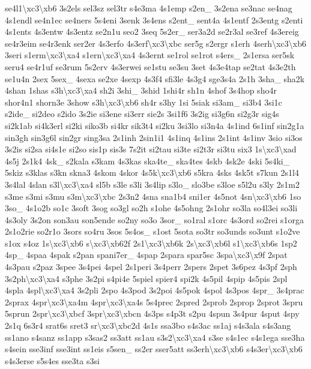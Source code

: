 {se4l1\textbackslash{}xc3\textbackslash{}xb6 3s2els sel3sz sel3tr s4e3ma 4s1emp s2en\-\_\- 3s2ena se3nac se4nag 4s1endl se4n1ec se4ners 5s4eni 3senk 3s4ens s2ent\-\_\- sent4a 4s1entf 2s3entg s2enti 4s1ents 4s3entw 4s3entz se2n1u seo2 3seq 5s2er\-\_\- ser3a2d se2r3al se3ref 4s3ereig se4r3eim se4r3enk ser2er 4s3erfo 4s3erf\textbackslash{}xc3\textbackslash{}xbc ser5g s2ergr s1erh 4serh\textbackslash{}xc3\textbackslash{}xb6 3seri s1erm\textbackslash{}xc3\textbackslash{}xa4 s1ern\textbackslash{}xc3\textbackslash{}xa4 4s3ernt se1rol se1rot s4ers\-\_\- 2s1ersa ser5sk seru4 se4r1uf se3rum 5s2erv 4s3erwei se1stu se3su 3set 4s3e4tap se2tat 4s3e2th se1u4n 2sex 5sex\-\_\- 4sexa se2xe 4sexp 4s3f4 sfi3le 4s3g4 sge3s4a 2s1h 3sha\-\_\- sha2k 4shan 1shas s3h\textbackslash{}xc3\textbackslash{}xa4 sh2i 3shi\-\_\- 3shid 1shi4r sh1n 4shof 3s4hop sho4r shor4n1 shorn3e 3show s3h\textbackslash{}xc3\textbackslash{}xb6 sh4r s3hy 1si 5siak si3am\-\_\- si3b4 3si1c s2ide\-\_\- si2deo s2ido 3s2ie si3ene si3err sie2s 3si1f6 3s2ig si3g6n si2g3r sig4s si2k1ab si4k3erl si2ki siko3b si4kr sik3t4 si2ku 3si3lo si3n4a 4s1ind 6s1inf sin2g1a sin3gh sin3g6l sin2gr sing3sa 2s1inh 2sin1i1 4s1inq 4s1ins 2s1int 4s1inv 3sio si3os 3s2is si2sa si4s1e si2so sis1p sis3s 7s2it si2tau si3te si2t3r si3tu six3 1s\textbackslash{}xc3\textbackslash{}xad 4s5j 2s1k4 4sk\-\_\- s2kala s3kam 4s3kas ska4te\-\_\- ska4tes 4skb 4sk2e 4ski 5s4ki\-\_\- 5skiz s3klas s3kn skna3 4skom 4skor 4s5k\textbackslash{}xc3\textbackslash{}xb6 s5kra 4sks 4sk5t s7kun 2s1l4 3s4lal 4slan s3l\textbackslash{}xc3\textbackslash{}xa4 sl5b s3le s3li 3s4lip s3lo\-\_\- slo3be s3loe s5l2u s3ly 2s1m2 s3me s3mi s3mu s3m\textbackslash{}xc3\textbackslash{}xbc 2s3n2 4sna sna1b4 sni1er 4s5not 4sn\textbackslash{}xc3\textbackslash{}xb6 1so 3so\-\_\- 4s1o2b so1c 3soft 3sog so3gl so2h s1ohe 4s5ohng 2s1ohr so3la so4l3ei so3li 4s3oly 3s2on son3au son5ende so2ny so3o 3sor\-\_\- so1ral s1orc 4s3ord so2rei s1orga 2s1o2rie so2r1o 3sors so4ru 3sos 5s4os\-\_\- s1ost 5sota so3tr so3unds so3unt s1o2ve s1ox s4oz 1s\textbackslash{}xc3\textbackslash{}xb6 s\textbackslash{}xc3\textbackslash{}xb62f 2s1\textbackslash{}xc3\textbackslash{}xb6k 2s\textbackslash{}xc3\textbackslash{}xb6l s1\textbackslash{}xc3\textbackslash{}xb6s 1sp2 4sp\-\_\- 4spaa 4spak s2pan spani7er\-\_\- 4spap 2spara spar5sc 3spa\textbackslash{}xc3\textbackslash{}x9f 2spat 4s3pau s2paz 3spee 3s4pei 4spel 2s1peri 3s4perr 2spers 2spet 3s6pez 4s3pf 2sph 3s2ph\textbackslash{}xc3\textbackslash{}xa4 s3phe 3s2pi s4pi4e 5spiel spier4 spi2k 4s5pil 4spip 4s5pis 2spl 4spla 4spl\textbackslash{}xc3\textbackslash{}xa4 3s2pli 2spo 4s3pod 3s2poi 4s5pok 4spol 4s3pos 4spr\-\_\- 3s4prac 2sprax 4spr\textbackslash{}xc3\textbackslash{}xa4m 4spr\textbackslash{}xc3\textbackslash{}xa4s 5s4prec 2spred 2sprob 2sprop 2sprot 3spru 5sprun 2spr\textbackslash{}xc3\textbackslash{}xbcf 3spr\textbackslash{}xc3\textbackslash{}xbcn 4s3ps s4p3t s2pu 4spun 3s4pur 4sput 4spy 2s1q 6s3r4 srat6s sret3 sr\textbackslash{}xc3\textbackslash{}xbc2d 4s1s ssa3bo s4s3ac ss1aj s4s3ala s4s3ang ss1ano s4sanz ss1app s3sas2 ss3att ss1au s3s2\textbackslash{}xc3\textbackslash{}xa4 s3se s4s1ec s4s1ega sse3ha s4sein sse3inf sse3int ss1eis s5sen\-\_\- ss2er sser5att ss3erh\textbackslash{}xc3\textbackslash{}xb6 s4s3er\textbackslash{}xc3\textbackslash{}xb6 s4s3erse s5s4es sse3ta s3si }
